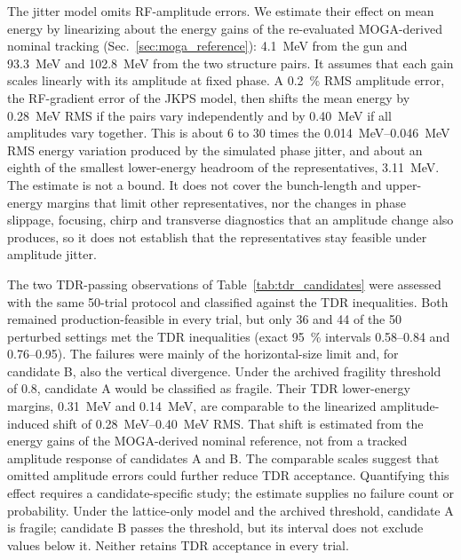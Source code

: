 \documentclass[aps,prab,reprint,superscriptaddress,amsmath,amssymb,floatfix]{revtex4-2}
\begin{document}
The jitter model omits RF-amplitude errors. We estimate their effect on mean energy by
linearizing about the energy gains of the re-evaluated MOGA-derived nominal tracking
(Sec.~\ref{sec:moga_reference}): \SI{4.1}{\mega\electronvolt} from the gun and
\SI{93.3}{\mega\electronvolt} and \SI{102.8}{\mega\electronvolt} from the two structure pairs.
It assumes that each gain scales linearly with its amplitude at fixed phase. A
\SI{0.2}{\percent} RMS amplitude error, the RF-gradient error of the JKPS model, then shifts the
mean energy by \SI{0.28}{\mega\electronvolt} RMS if the pairs vary independently and by
\SI{0.40}{\mega\electronvolt} if all amplitudes vary together. This is about 6 to 30 times the
\SIrange{0.014}{0.046}{\mega\electronvolt} RMS energy variation produced by the simulated phase
jitter, and about an eighth of the smallest lower-energy headroom of the representatives,
\SI{3.11}{\mega\electronvolt}. The estimate is not a bound. It does not cover the bunch-length
and upper-energy margins that limit other representatives, nor the changes in phase slippage,
focusing, chirp and transverse diagnostics that an amplitude change also produces, so it does
not establish that the representatives stay feasible under amplitude jitter.

The two TDR-passing observations of Table~\ref{tab:tdr_candidates} were assessed with the same
50-trial protocol and classified against the TDR inequalities. Both remained production-feasible
in every trial, but only 36 and 44 of the 50 perturbed settings met the TDR inequalities (exact
\SI{95}{\percent} intervals 0.58--0.84 and 0.76--0.95). The failures were mainly of the
horizontal-size limit and, for candidate B, also the vertical divergence. Under the archived
fragility threshold of 0.8, candidate A would be classified as fragile. Their TDR lower-energy
margins, \SI{0.31}{\mega\electronvolt} and \SI{0.14}{\mega\electronvolt}, are comparable to the
linearized amplitude-induced shift of \SIrange{0.28}{0.40}{\mega\electronvolt} RMS. That shift
is estimated from the energy gains of the MOGA-derived nominal reference, not from a tracked
amplitude response of candidates A and B. The comparable scales suggest that omitted amplitude
errors could further reduce TDR acceptance. Quantifying this effect requires a
candidate-specific study; the estimate supplies no failure count or probability. Under the
lattice-only model and the archived threshold, candidate A is fragile; candidate B passes the
threshold, but its interval does not exclude values below it. Neither retains TDR acceptance in
every trial.
\end{document}
